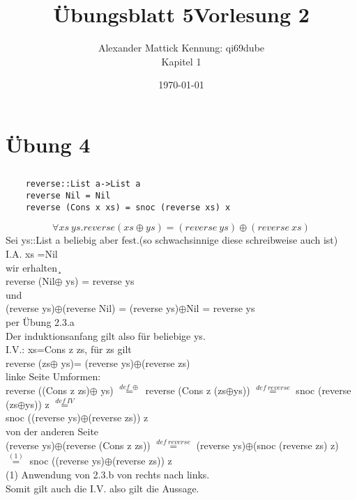 \documentclass{article}
\title{Übungsblatt 5}
\author{
Alexander Mattick Kennung: qi69dube\\
Kapitel 1
}
\date{\today}
\title{Vorlesung 2}
\theoremstyle{definition}
\begin{document}
	\section{Übung 4}
	\subsection{}
	\begin{verbatim}
	reverse::List a->List a
	reverse Nil = Nil
	reverse (Cons x xs) = snoc (reverse xs) x
	\end{verbatim}
	\[\forall xs\ ys.reverse (xs\oplus ys)= (reverse\ ys)\oplus(reverse\ xs)\]
	Sei ys::List a beliebig aber fest.(so schwachsinnige diese schreibweise auch ist)\\
	I.A. xs =Nil\\
	wir erhalten¸\\
	reverse (Nil$\oplus$ ys) = reverse ys\\
	und\\
	(reverse ys)$\oplus$(reverse Nil) = (reverse ys)$\oplus$Nil =  reverse ys\\
	per Übung 2.3.a\\
	Der induktionsanfang gilt also für beliebige ys.\\
	I.V.: xs=Cons z zs, für zs gilt\\
	reverse (zs$\oplus$ ys)= (reverse ys)$\oplus$(reverse zs)\\
	linke Seite Umformen:\\
	reverse ((Cons z zs)$\oplus$ ys) $\stackrel{def\ \oplus}{=}$ reverse (Cons z (zs$\oplus$ys)) $\stackrel{def\ reverse}{=}$ snoc (reverse (zs$\oplus$ys)) z $\stackrel{def\ IV}{=}$\\
	snoc ((reverse ys)$\oplus$(reverse zs)) z\\
	von der anderen Seite\\
	(reverse ys)$\oplus$(reverse (Cons z zs)) $\stackrel{def\ reverse}{=}$ (reverse ys)$\oplus$(snoc (reverse zs) z) $\stackrel{(1)}{=}$ snoc ((reverse ys)$\oplus$(reverse zs)) z\\
	(1) Anwendung von 2.3.b von rechts nach links.\\
	Somit gilt auch die I.V. also gilt die Aussage.\\
	\subsection{}
\end{document}
